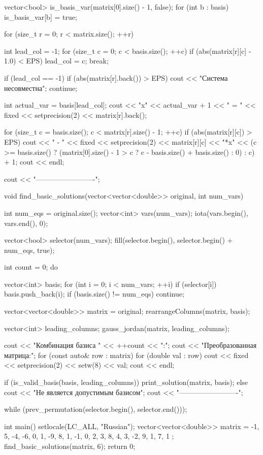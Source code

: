 \documentclass{report}
\begin{document}
\begin{code}
{	vector<bool> is_basis_var(matrix[0].size() - 1, false);
	for (int b : basis) is_basis_var[b] = true;
	
	for (size_t r = 0; r < matrix.size(); ++r) {
		int lead_col = -1;
		for (size_t c = 0; c < basis.size(); ++c) {
			if (abs(matrix[r][c] - 1.0) < EPS) {
				lead_col = c;
				break;
			}
		}
		
		if (lead_col == -1) {
			if (abs(matrix[r].back()) > EPS)
			cout << "Система несовместна\n";
			continue;
		}
		
		int actual_var = basis[lead_col];
		cout << "x" << actual_var + 1 << " = " << fixed << setprecision(2) << matrix[r].back();
		
		for (size_t c = basis.size(); c < matrix[r].size() - 1; ++c) {
			if (abs(matrix[r][c]) > EPS) {
				cout << " - " << fixed << setprecision(2) << matrix[r][c]
				<< "*x" << (c >= basis.size() ?
				(matrix[0].size() - 1 > c ? c - basis.size() + basis.size() : 0) : c) + 1;
			}
		}
		cout << endl;
	}
	cout << "-------------------------\n";
}

void find_basic_solutions(vector<vector<double>> original, int num_vars) {
	int num_eqs = original.size();
	vector<int> vars(num_vars);
	iota(vars.begin(), vars.end(), 0);
	
	vector<bool> selector(num_vars);
	fill(selector.begin(), selector.begin() + num_eqs, true);
	
	int count = 0;
	do {
		vector<int> basis;
		for (int i = 0; i < num_vars; ++i)
		if (selector[i]) basis.push_back(i);
		if (basis.size() != num_eqs) continue;
		
		vector<vector<double>> matrix = original;
		rearrangeColumns(matrix, basis);
		
		vector<int> leading_columns;
		gauss_jordan(matrix, leading_columns);
		
		cout << "Комбинация базиса " << ++count << ":\n";
		cout << "Преобразованная матрица:\n";
		for (const auto& row : matrix) {
			for (double val : row) cout << fixed << setprecision(2) << setw(8) << val;
			cout << endl;
		}
		
		if (is_valid_basis(basis, leading_columns)) {
			print_solution(matrix, basis);
		}
		else {
			cout << "Не является допустимым базисом\n";
			cout << "-------------------------\n";
		}
		
	} while (prev_permutation(selector.begin(), selector.end()));
}

int main() {
	setlocale(LC_ALL, "Russian");
	vector<vector<double>> matrix = {
		{-1, 5, -4, -6, 0, 1, -9},
		{8, 1, -1, 0, 2, 3, 8},
		{4, 3, -2, 9, 1, 7, 1}
	};
	find_basic_solutions(matrix, 6);
	return 0;
}
	\end{code}
	
\end{document}
